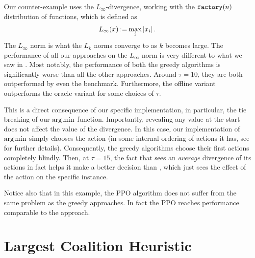 Our counter-example uses the $ L_\infty $-divergence, working with the $ \texttt{factory}\!\left(n\right) $ distribution of functions, which is defined as \[
  L_\infty\!\left(x\right) \mathbin{:=} \max_i \left\lvert x_i \right\rvert.
\]
The $ L_\infty $ norm is what the $ L_k $ norms converge to as $ k $ becomes large.
The performance of all our approaches on the $L_\infty$ norm is very different to what we saw in .
Most notably, the performance of both the greedy algorithms is significantly worse than all the other approaches.
Around $ \tau = 10 $, they are both outperformed by even the \algRand{} benchmark.
Furthermore, the offline variant outperforms the oracle variant for some choices of $ \tau $.

This is a direct consequence of our specific implementation, in particular, the tie breaking of our $ \operatorname*{arg\,min} $ function.
Importantly, revealing any value at the start does not affect the value of the divergence.
In this case, our implementation of $ \operatorname*{arg\,min} $ simply chooses the  action (in some internal ordering of actions it has, see  for further details).
Consequently, the greedy algorithms choose their first actions completely blindly.
Then, at $ \tau=15 $, the fact that \algFG{} sees an \emph{average} divergence of its actions in fact helps it make a better decision than \algRG{}, which just sees the effect of the action on the specific instance.

Notice also that in this example, the PPO algorithm does not suffer from the same problem as the greedy approaches. 
In fact the PPO reaches performance comparable to the \algRO{} approach.

\section{Largest Coalition Heuristic}
\label{ssec:largest}

